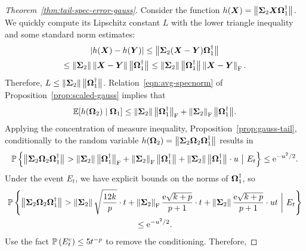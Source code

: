\documentclass[final]{siamltex}
\newcommand{\pgnotate}[1]{{\color{blue}[#1]}}
\newcommand{\notate}[1]{\textcolor{red}{\textbf{[#1]}}}
\begin{document}
\begin{proof}[Theorem~\ref{thm:tail-spec-error-gauss}]
Consider the function
$h( \mtx{X} ) = \smnorm{}{ \mtx{\Sigma}_2 \mtx{X} \mtx{\Omega}_1^\psinv }$.
We quickly compute its Lipschitz constant $L$ with the lower triangle inequality
and some standard norm estimates:
\begin{multline*}
\abs{ h(\mtx{X}) - h(\mtx{Y}) }
    \leq \smnorm{}{ \mtx{\Sigma}_2 (\mtx{X} - \mtx{Y}) \mtx{\Omega}_1^\psinv } \\
    \leq \norm{ \mtx{\Sigma}_2 } \norm{ \mtx{X} - \mtx{Y} } \smnorm{}{ \mtx{\Omega}_1^\psinv }
    \leq \norm{ \mtx{\Sigma}_2 } \smnorm{}{ \mtx{\Omega}_1^\psinv } \fnorm{ \mtx{X} - \mtx{Y} }.
\end{multline*}
Therefore, $L \leq \norm{\mtx{\Sigma}_2} \smnorm{}{\mtx{\Omega}_1^\psinv}$.
Relation~\eqref{eqn:avg-specnorm} of Proposition~\ref{prop:scaled-gauss} implies that
$$
\Expect[ h(\mtx{\Omega}_2) \; | \; \mtx{\Omega}_1 ]
    \leq \norm{\mtx{\Sigma}_2} \smnorm{\rm F}{ \mtx{\Omega}_1^\psinv }
        + \fnorm{\mtx{\Sigma}_2} \smnorm{}{ \mtx{\Omega}_1^\psinv }.
$$
Applying the concentration of measure inequality, Proposition~\ref{prop:gauss-tail}, conditionally
to the random variable
$h(\mtx{\Omega}_2) = \smnorm{}{ \mtx{\Sigma}_2 \mtx{\Omega}_2 \mtx{\Omega}_1^\psinv }$
results in
\begin{equation*}
\Prob{ \smnorm{}{\mtx{\Sigma}_2\mtx{\Omega}_2\mtx{\Omega}_1^\psinv}
    > \norm{\mtx{\Sigma}_2} \smnorm{\rm F}{ \mtx{\Omega}_1^\psinv }
        + \fnorm{\mtx{\Sigma}_2} \smnorm{}{ \mtx{\Omega}_1^\psinv }
    + \norm{\mtx{\Sigma}_2} \smnorm{}{\mtx{\Omega}_1^\psinv} \cdot u \ \big\vert \ E_t }
    \leq \econst^{-u^2/2}.
\end{equation*}
Under the event $E_t$, we have explicit bounds on the norms of $\mtx{\Omega}_1^\psinv$,
so
\begin{multline*}
\Prob{ \smnorm{}{\mtx{\Sigma}_2\mtx{\Omega}_2\mtx{\Omega}_1^\psinv}
    > \norm{\mtx{\Sigma}_2} \sqrt{\frac{12k}{p}} \cdot t
    + \fnorm{\mtx{\Sigma}_2} \frac{\econst\sqrt{k+p}}{p+1} \cdot t
    + \norm{\mtx{\Sigma}_2} \frac{\econst\sqrt{k+p}}{p+1} \cdot ut \ \bigg\vert \ E_t } \\
    \leq \econst^{-u^2/2}.
\end{multline*}
Use the fact $\Probe{E_t^c} \leq 5 t^{-p}$ to remove the conditioning.  Therefore,

\end{proof}
\end{document}
